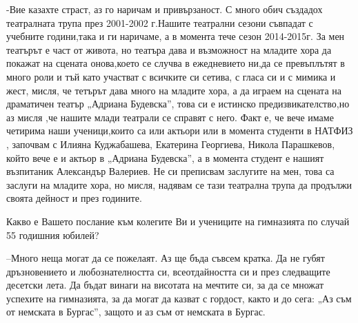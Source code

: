 \begin{multicols}{3}
-Вие казахте страст, аз го наричам и привързаност. С много обич създадох 
театралната трупа през 2001-2002 г.Нашите театрални сезони съвпадат с учебните 
години,така и ги наричаме, а в момента тече сезон 2014-2015г. За мен театърът е 
част от живота, но театъра дава и възможност на младите хора да покажат на 
сцената онова,което се случва в ежедневието ни,да се превъплътят в много роли и 
тъй като участват с всичките си сетива, с гласа си и с мимика и жест, мисля, че 
тетърът дава много на младите хора, а да играем на сцената на драматичен театър 
„Адриана Будевска”, това си е истинско предизвикателство,но аз мисля ,че нашите 
млади театрали се справят с него. Факт е, че вече имаме четирима наши 
ученици,които са или актьори  или в момента студенти в  НАТФИЗ , започвам с 
Илияна Куджабашева, Екатерина Георгиева, Никола Парашкевов, който вече е и 
актьор в „Адриана Будевска”, а в момента студент е нашият възпитаник  Александър 
Валериев. Не си преписвам заслугите на мен, това са заслуги на младите хора, но 
мисля, надявам се тази театрална трупа да продължи своята дейност и през  
годините.

Какво е Вашето послание към колегите Ви и учениците на гимназията по случай 55 
годишния юбилей? 

–Много неща могат да се пожелаят. Аз ще бъда съвсем кратка.  Да не губят 
дръзновението и любознателността си, всеотдайността си и през следващите 
десетски лета. Да бъдат винаги на висотата на  мечтите си, за да се множат 
успехите на гимназията, за да могат да казват  с гордост, както и до сега: „Аз 
съм от немската в Бургас”, защото и аз съм от немската в Бургас.

\closearticle
\end{multicols}